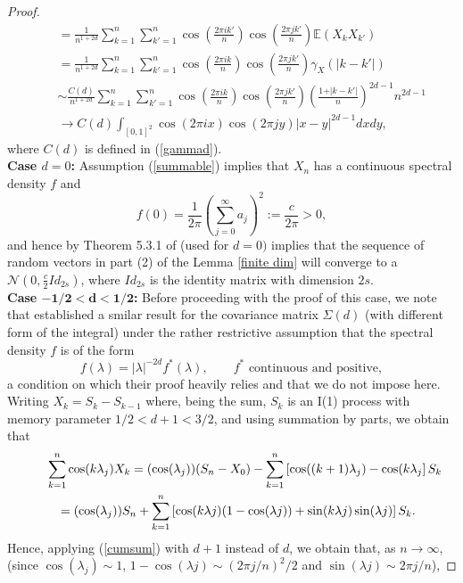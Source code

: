 \documentclass[12pt]{article}
\begin{document}
\begin{proof}
\begin{eqnarray}
    &&=\frac{1}{n^{1+2d}}\sum_{k=1}^n\sum_{k'=1}^n\cos\left(\frac{2\pi ik'}{n}\right)\cos\left(\frac{2\pi jk'}{n}\right)\mathbb{E}\left(X_kX_{k'}\right)\nonumber\\ 
    &&=\frac{1}{n^{1+2d}}\sum_{k=1}^n\sum_{k'=1}^n\cos\left(\frac{2\pi ik}{n}\right)\cos\left(\frac{2\pi jk'}{n}\right)\gamma_X(\vert k-k'\vert)\nonumber\\
    &&\sim\frac{C(d)}{n^{1+2d}}\sum_{k=1}^n\sum_{k'=1}^n\cos\left(\frac{2\pi ik}{n}\right)\cos\left(\frac{2\pi jk'}{n}\right)\left(\frac{1+\vert k-k'\vert}{n}\right)^{2d-1}n^{2d-1}\nonumber\\
&&\to C(d)\int_{[0,1]^2}\cos(2\pi ix)\cos(2\pi jy)\vert x- y\vert^{2d-1}dxdy,
\end{eqnarray}
where $C(d)$ is defined in (\ref{gammad}).\\
{\bf Case $d=0$:} Assumption (\ref{summable}) implies that $X_n$ has a continuous spectral density $f$ and 
$$
f(0)=\frac{1}{2\pi}\left(\sum_{j=0}^\infty a_j\right)^2:=\frac{c}{2\pi}>0,
$$
and hence by Theorem 5.3.1 of  \cite{MR2977317} (used for $d=0)$ implies that the sequence of random vectors in part (2) of the Lemma  \ref{finite dim} will converge to a $\mathcal{N}(0,\frac{c}{2}Id_{2s})$, where $Id_{2s}$ is the identity matrix with dimension $2s$.\\
\fi
{\bf Case $\mathbf{-1/2<d<1/2}$:} 
Before proceeding with the proof of this case, we note that \cite{MR1243575} established a smilar  result for the covariance matrix $\Sigma(d)$ (with different form of the integral) under the rather restrictive assumption that the spectral density $f$ is of the form
\[
f(\lambda)=|\lambda|^{-2d}f^*(\lambda), \qquad f^* \text{ continuous and positive},
\]
a condition on which their proof heavily relies and that we do not impose here.\\
Writing $X_k=S_k-S_{k-1}$ where, being the sum, $S_k$ is an I(1) process with memory parameter $1/2<d+1<3/2$, and using summation by parts, we obtain that 
\begin{eqnarray}\label{expansion}\lefteqn{
\sum_{k=1}^n\cos(k\lambda_{j})X_k=(\cos(\lambda_j))(S_n-X_0)-\sum_{k=1}^n\left[\cos((k+1)\lambda_j)-\cos(k\lambda_j\right]S_k}\nonumber\\
&&=(\cos(\lambda_j))S_n+
\sum_{k=1}^n\left[\cos(k\lambda j)(1-\cos(\lambda j))+\sin(k\lambda j)\sin(\lambda j)\right]S_k.
\end{eqnarray}
Hence,  applying (\ref{cumsum}) with $d+1$ instead of $d$, we obtain that, as $n\to\infty$, (since  $\cos(\lambda_j)\sim1$, $1-\cos(\lambda j)\sim(2\pi j/n)^2/2$ and $\sin(\lambda j)\sim2\pi j/n$),

\end{proof}
\end{document}
